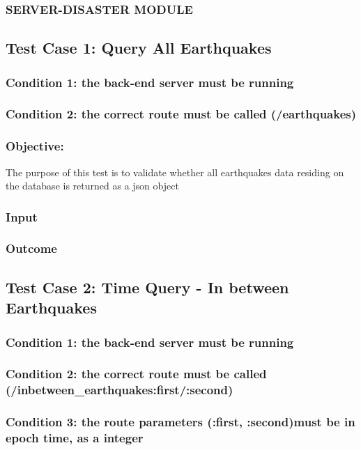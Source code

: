 \subsubsection*{SERVER-DISASTER MODULE}
\subsection{Test Case 1: Query All Earthquakes}
\subsubsection{Condition 1: the back-end server must be running}
\subsubsection{Condition 2: the correct route must be called (/earthquakes)}
\subsubsection{Objective:} The purpose of this test is to validate whether all earthquakes data residing on the database is returned  as a json object
\subsubsection{Input}
\subsubsection{Outcome}

\subsection{Test Case 2: Time Query - In between Earthquakes}

\subsubsection{Condition 1: the back-end server must be running}
\subsubsection{Condition 2: the correct route must be called (/inbetween\_earthquakes:first/:second)}
\subsubsection{Condition 3: the route parameters (:first, :second)must be in epoch time, as a integer}
